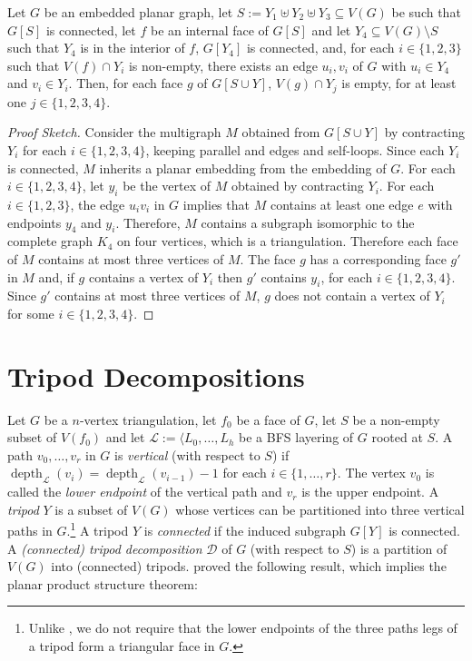 \documentclass{patmorin}
\DeclareMathOperator{\depth}{depth}
\begin{document}
\begin{lem}
  Let $G$ be an embedded planar graph, let $S:=Y_1\uplus Y_2\uplus Y_3\subseteq V(G)$ be such that $G[S]$ is connected, let $f$ be an internal face of $G[S]$ and let $Y_4\subseteq V(G)\setminus S$ such that $Y_4$ is in the interior of $f$, $G[Y_4]$ is connected, and, for each $i\in\{1,2,3\}$ such that $V(f)\cap Y_i$ is non-empty, there exists an edge $u_i,v_i$ of $G$ with $u_i\in Y_4$ and $v_i\in Y_i$.  Then, for each face $g$ of $G[S\cup Y]$, $V(g)\cap Y_j$ is empty, for at least one $j\in\{1,2,3,4\}$.
\end{lem}

\begin{proof}[Proof Sketch]
  Consider the multigraph $M$ obtained from $G[S\cup Y]$ by contracting $Y_i$ for each $i\in\{1,2,3,4\}$, keeping parallel and edges and self-loops.  Since each $Y_i$ is connected, $M$ inherits a planar embedding from the embedding of $G$. For each $i\in\{1,2,3,4\}$, let $y_i$ be the vertex of $M$ obtained by contracting $Y_i$.  For each $i\in\{1,2,3\}$, the edge $u_iv_i$ in $G$ implies that $M$ contains at least one edge $e$ with endpoints $y_4$ and $y_i$.  Therefore, $M$ contains a subgraph isomorphic to the complete graph $K_4$ on four vertices, which is a triangulation.  Therefore each face of $M$ contains at most three vertices of $M$. The face $g$ has a corresponding face $g'$ in $M$ and, if $g$ contains a vertex of $Y_i$ then $g'$ contains $y_i$, for each $i\in\{1,2,3,4\}$. Since $g'$ contains at most three vertices of $M$, $g$ does not contain a vertex of $Y_i$ for some $i\in\{1,2,3,4\}$.
\end{proof}

\section{Tripod Decompositions}


Let $G$ be a $n$-vertex triangulation, let $f_0$ be a face of $G$, let $S$ be a non-empty subset of $V(f_0)$ and let $\mathcal{L}:=\langle L_0,\ldots,L_h$ be a BFS layering of $G$ rooted at $S$.  A path $v_0,\ldots,v_r$ in $G$ is \emph{vertical} (with respect to $S$) if $\depth_\mathcal{L}(v_i)=\depth_{\mathcal{L}}(v_{i-1})-1$ for each $i\in\{1,\ldots,r\}$. The vertex $v_0$ is called the \emph{lower endpoint} of the vertical path and $v_r$ is the upper endpoint. A \emph{tripod} $Y$ is a subset of $V(G)$ whose vertices can be partitioned into three vertical paths in $G$.\footnote{Unlike \cite{dujmovic.joret.ea:planar}, we do not require that the lower endpoints of the three paths legs of a tripod form a triangular face in $G$.}
A tripod $Y$ is \emph{connected} if the induced subgraph $G[Y]$ is connected.  A \emph{(connected) tripod decomposition} $\mathcal{D}$ of $G$ (with respect to $S$) is a partition of $V(G)$ into (connected) tripods.  \citet{dujmovic.joret.ea:planar} proved the following result, which implies the planar product structure theorem:
\end{document}
